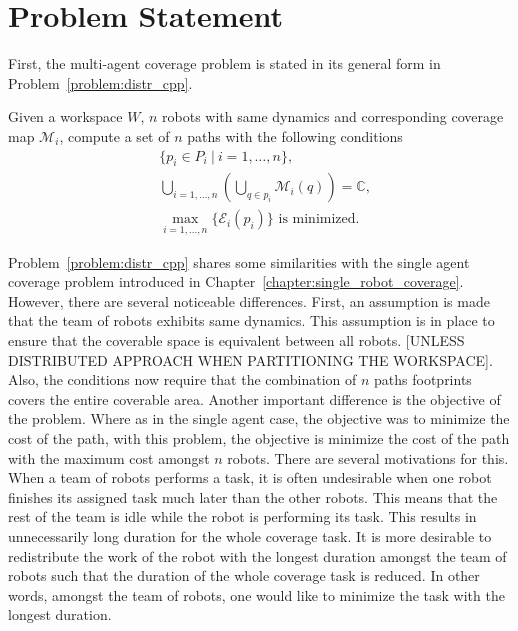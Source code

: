 \documentclass[../main.tex]{subfiles}
\begin{document}
\section{Problem Statement}
\label{sec:multi_problem_statement}

First, the multi-agent coverage problem is stated in its general form in Problem~\ref{problem:distr_cpp}.

\begin{problem}
\label{problem:distr_cpp}
	Given a workspace $W$, $n$ robots with same dynamics and corresponding coverage map $\mathcal{M}_i$, compute a set of $n$ paths with the following conditions
	\begin{equation}
	\begin{aligned}
		& \{p_i\in P_{i}\ |\ i=1,\dots,n\},\\
		& \bigcup_{i=1,\dots,n}(\bigcup_{q\in p_i}\mathcal{M}_i(q))=\mathbb{C},\\
		& \max_{i=1,\ldots,n}\{\mathcal{E}_i(p_i)\}\text{ is minimized.}
	\end{aligned}
	\end{equation}
\end{problem}

Problem~\ref{problem:distr_cpp} shares some similarities with the single agent coverage problem introduced in Chapter~\ref{chapter:single_robot_coverage}. However, there are several noticeable differences. First, an assumption is made that the team of robots exhibits same dynamics. This assumption is in place to ensure that the coverable space is equivalent between all robots. [UNLESS DISTRIBUTED APPROACH WHEN PARTITIONING THE WORKSPACE]. Also, the conditions now require that the combination of $n$ paths footprints covers the entire coverable area. Another important difference is the objective of the problem. Where as in the single agent case, the objective was to minimize the cost of the path, with this problem, the objective is minimize the cost of the path with the maximum cost amongst $n$ robots. There are several motivations for this. When a team of robots performs a task, it is often undesirable when one robot finishes its assigned task much later than the other robots. This means that the rest of the team is idle while the robot is performing its task. This results in unnecessarily long duration for the whole coverage task. It is more desirable to redistribute the work of the robot with the longest duration amongst the team of robots such that the duration of the whole coverage task is reduced. In other words, amongst the team of robots, one would like to minimize the task with the longest duration.
\end{document}
